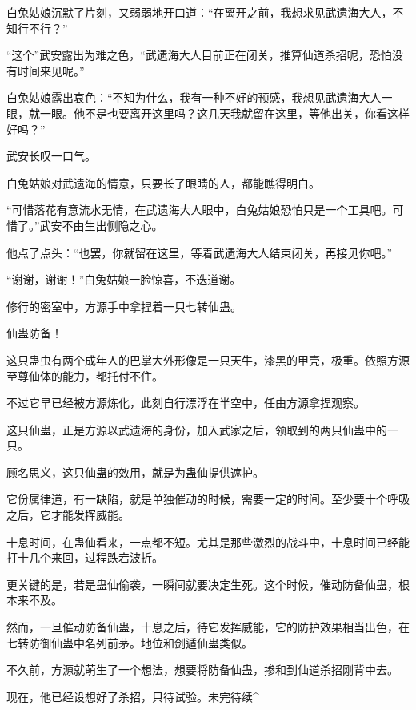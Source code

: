 \begin{this_body}
白兔姑娘沉默了片刻，又弱弱地开口道：“在离开之前，我想求见武遗海大人，不知行不行？”

“这个”武安露出为难之色，“武遗海大人目前正在闭关，推算仙道杀招呢，恐怕没有时间来见呢。”

白兔姑娘露出哀色：“不知为什么，我有一种不好的预感，我想见武遗海大人一眼，就一眼。他不是也要离开这里吗？这几天我就留在这里，等他出关，你看这样好吗？”

武安长叹一口气。

白兔姑娘对武遗海的情意，只要长了眼睛的人，都能瞧得明白。

“可惜落花有意流水无情，在武遗海大人眼中，白兔姑娘恐怕只是一个工具吧。可惜了。”武安不由生出恻隐之心。

他点了点头：“也罢，你就留在这里，等着武遗海大人结束闭关，再接见你吧。”

“谢谢，谢谢！”白兔姑娘一脸惊喜，不迭道谢。

修行的密室中，方源手中拿捏着一只七转仙蛊。

仙蛊防备！

这只蛊虫有两个成年人的巴掌大外形像是一只天牛，漆黑的甲壳，极重。依照方源至尊仙体的能力，都托付不住。

不过它早已经被方源炼化，此刻自行漂浮在半空中，任由方源拿捏观察。

这只仙蛊，正是方源以武遗海的身份，加入武家之后，领取到的两只仙蛊中的一只。

顾名思义，这只仙蛊的效用，就是为蛊仙提供遮护。

它份属律道，有一缺陷，就是单独催动的时候，需要一定的时间。至少要十个呼吸之后，它才能发挥威能。

十息时间，在蛊仙看来，一点都不短。尤其是那些激烈的战斗中，十息时间已经能打十几个来回，过程跌宕波折。

更关键的是，若是蛊仙偷袭，一瞬间就要决定生死。这个时候，催动防备仙蛊，根本来不及。

然而，一旦催动防备仙蛊，十息之后，待它发挥威能，它的防护效果相当出色，在七转防御仙蛊中名列前茅。地位和剑遁仙蛊类似。

不久前，方源就萌生了一个想法，想要将防备仙蛊，掺和到仙道杀招刚背中去。

现在，他已经设想好了杀招，只待试验。未完待续\^{}

\end{this_body}

